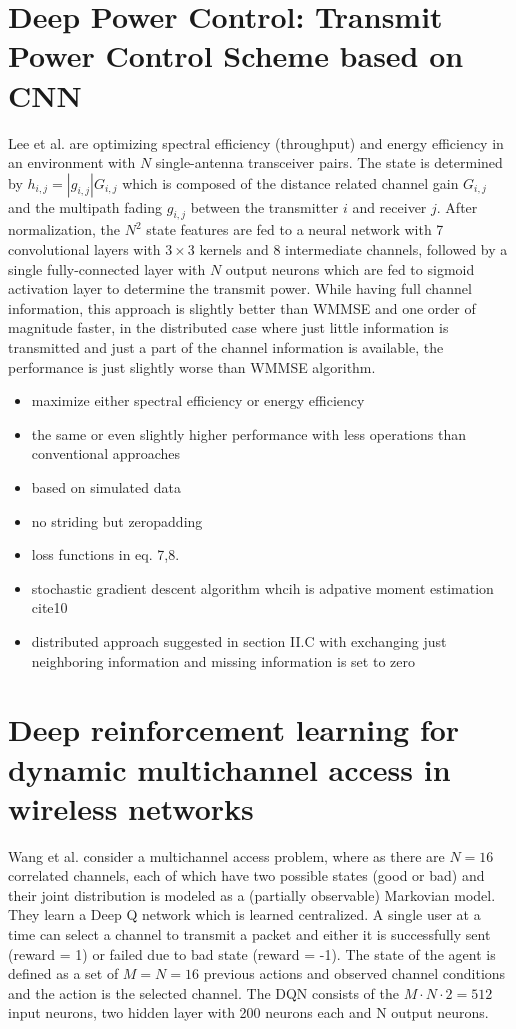 \section{{Deep Power Control: Transmit Power Control Scheme based on CNN \cite{Lee2018}}}
Lee et al. are optimizing spectral efficiency (throughput) and energy efficiency in an environment with $N$ single-antenna transceiver pairs. The state is determined by $h_{i,j}=|g_{i,j}|G_{i,j}$ which is composed of the distance related channel gain $G_{i,j}$ and the multipath fading $g_{i,j}$ between the transmitter $i$ and receiver $j$. After normalization, the $N^2$ state features are fed to a neural network with 7 convolutional layers with $3\times 3$ kernels and 8 intermediate channels, followed by a single fully-connected layer with $N$ output neurons which are fed to sigmoid activation layer to determine the transmit power. While having full channel information, this approach is slightly better than WMMSE and one order of magnitude faster, in the distributed case where just little information is transmitted and just a part of the channel information is available, the performance is just slightly worse than WMMSE algorithm.
\ifdefined\SHOWNOTES
\begin{itemize}
    \item maximize either spectral efficiency or energy efficiency
    \item the same or even slightly higher performance with less operations than conventional approaches
    \item based on simulated data
    \item no striding but zeropadding
    \item loss functions in eq. 7,8.
    \item stochastic gradient descent algorithm whcih is adpative moment estimation cite10
    \item distributed approach suggested in section II.C with exchanging just neighboring information and missing information is set to zero
\end{itemize}

\fi
\section{Deep reinforcement learning for dynamic multichannel access in wireless networks \cite{wang2018deep}}
Wang et al. consider a multichannel access problem, where as there are $N=16$ correlated channels, each of which have two possible states (good or bad) and their joint distribution is modeled as a (partially observable) Markovian model. They learn a Deep Q network which is learned centralized. A single user at a time can select a channel to transmit a packet and either it is successfully sent (reward = 1) or failed due to bad state (reward = -1). The state of the agent is defined as a set of $M=N=16$ previous actions and observed channel conditions and the action is the selected channel. The DQN consists of the $M\cdot N\cdot 2=512$ input neurons, two hidden layer with 200 neurons each and N output neurons. 

